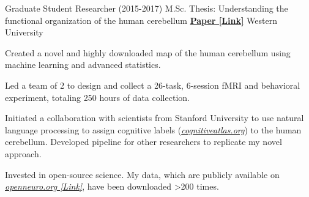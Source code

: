 \begin{cventries}
  \cventry
    {Graduate Student Researcher (2015-2017)} %
    {M.Sc. Thesis: Understanding the functional organization of the human cerebellum}
    {\href{http://ivrylab.berkeley.edu/uploads/4/1/1/5/41152143/functional_boundaries_in_the_human_cerebellum.pdf}{\textbf{Paper [Link]}}}
    {Western University} %
    {
      \begin{cvitems} %
        \item {Created a novel and highly downloaded map of the human cerebellum using machine learning and advanced statistics.}
      	\item {Led a team of 2 to design and collect a 26-task, 6-session fMRI and behavioral experiment, totaling 250 hours of data collection.}
      	\item {Initiated a collaboration with scientists from Stanford University to use natural language processing to assign cognitive labels ({\href{https://cognitiveatlas.org/}{\textit{cognitiveatlas.org}}}) to the human cerebellum. Developed pipeline for other researchers to replicate my novel approach.}
      	\item {Invested in open-source science. My data, which are publicly available on {\href{https://openneuro.org/datasets/ds002105/versions/1.1.0}{\textit{openneuro.org [Link]}}}, have been downloaded >200 times.}
      \end{cvitems}
    }

\end{cventries}
